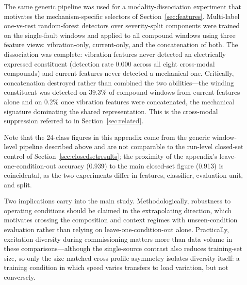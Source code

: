 The same generic pipeline was used for a modality-dissociation experiment
that motivates the mechanism-specific selectors of
Section~\ref{sec:features}. Multi-label one-vs-rest random-forest detectors
over severity-split components were trained on the single-fault windows and
applied to all compound windows using three feature views: vibration-only,
current-only, and the concatenation of both. The dissociation was complete:
vibration features never detected an electrically expressed constituent
(detection rate 0.000 across all eight cross-modal compounds) and current
features never detected a mechanical one. Critically, concatenation
destroyed rather than combined the two abilities---the winding constituent
was detected on 39.3\% of compound windows from current features alone and
on 0.2\% once vibration features were concatenated, the mechanical
signature dominating the shared representation. This is the cross-modal
suppression referred to in Section~\ref{sec:related}.

Note that the 24-class figures in this appendix come from the generic
window-level pipeline described above and are not comparable to the
run-level closed-set control of Section~\ref{sec:closedsetresults}; the
proximity of the appendix's leave-one-condition-out accuracy (0.939) to the
main closed-set figure (0.913) is coincidental, as the two experiments
differ in features, classifier, evaluation unit, and split.

Two implications carry into the main study. Methodologically, robustness to
operating conditions should be claimed in the extrapolating direction,
which motivates crossing the composition and context regimes with
unseen-condition evaluation rather than relying on leave-one-condition-out
alone. Practically, excitation diversity during commissioning matters more
than data volume in these comparisons---although the single-source contrast
also reduces training-set size, so only the size-matched cross-profile
asymmetry isolates diversity itself: a training condition in which speed
varies transfers to load variation, but not conversely.
